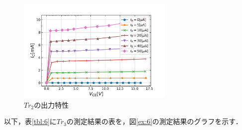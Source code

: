 \documentclass[10pt, a4j, dvipdfmx]{jarticle}
\begin{document}
    \begin{figure}[H]
        \centering
        \includegraphics[height=50mm]{ex-5.png}
        \caption{$Tr_2$の出力特性}
        \label{ex:5}
    \end{figure}

    \newpage
    以下，表\ref{tbl:6}に$Tr_3$の測定結果の表を，図\ref{ex:6}の測定結果のグラフを示す．
\end{document}
